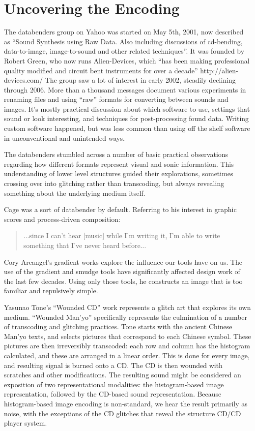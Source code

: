 \documentclass{thesis}
\begin{document}
\section{Uncovering the Encoding}
	The databenders group on Yahoo\cite{indianropeburn_databenders_????} was started on May 5th, 2001, now described as ``Sound Synthesis using Raw Data. Also including discussions of cd-bending, data-to-image, image-to-sound and other related techniques''. It was founded by Robert Green, who now runs Alien-Devices, which ``has been making professional quality modified and circuit bent instruments for over a decade'' http://alien-devices.com/ The group saw a lot of interest in early 2002, steadily declining through 2006. More than a thousand messages document various experiments in renaming files and using ``raw'' formats for converting between sounds and images. It's mostly practical discussion about which software to use, settings that sound or look interesting, and techniques for post-processing found data. Writing custom software happened, but was less common than using off the shelf software in unconventional and unintended ways.
	
	The databenders stumbled across a number of basic practical observations regarding how different formats represent visual and sonic information. This understanding of lower level structures guided their explorations, sometimes crossing over into glitching rather than transcoding, but always revealing something about the underlying medium itself.
	
	Cage was a sort of databender by default. Referring to his interest in graphic scores and process-driven composition:

\begin{quote}
...since I can't hear [music] while I'm writing it, I'm able to write something that I've never heard before...
\end{quote}

	Cory Arcangel's gradient works\cite{cory_arcangel_photoshop_2009} explore the influence our tools have on us. The use of the gradient and smudge tools have significantly affected design work of the last few decades. Using only those tools, he constructs an image that is too familiar and repulsively simple.
	
	Yasunao Tone's ``Wounded CD''\cite{media_art_net_media_2010} work represents a glitch art that explores its own medium. ``Wounded Man'yo'' specifically represents the culmination of a number of transcoding and glitching practices. Tone starts with the ancient Chinese Man'yo texts, and selects pictures that correspond to each Chinese symbol. These pictures are then irreversibly transcoded: each row and column has the histogram calculated, and these are arranged in a linear order. This is done for every image, and resulting signal is burned onto a CD. The CD is then wounded with scratches and other modifications. The resulting sound might be considered an exposition of two representational modalities: the histogram-based image representation, followed by the CD-based sound representation. Because histogram-based image encoding is non-standard, we hear the result primarily as noise, with the exceptions of the CD glitches that reveal the structure CD/CD player system.
	
\end{document}

